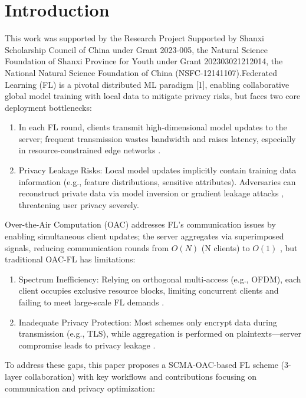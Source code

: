 \documentclass[runningheads]{llncs}
\begin{document}
\section{Introduction}
This work was supported by the Research Project Supported by Shanxi Scholarship Council of China under Grant 2023-005, the Natural Science Foundation of Shanxi Province for Youth under Grant 202303021212014, the National Natural Science Foundation of China (NSFC-12141107).Federated Learning (FL) is a pivotal distributed ML paradigm [1], enabling collaborative global model training with local data to mitigate privacy risks, but faces two core deployment bottlenecks:
\begin{enumerate}
\item In each FL round, clients transmit high-dimensional model updates to the server; frequent transmission wastes bandwidth and raises latency, especially in resource-constrained edge networks \cite{wang2019adaptive}.
\item  Privacy Leakage Risks: Local model updates implicitly contain training data information (e.g., feature distributions, sensitive attributes). Adversaries can reconstruct private data via model inversion or gradient leakage attacks \cite{yin2021comprehensive}, threatening user privacy severely.
\end{enumerate}
Over-the-Air Computation (OAC) addresses FL's communication issues by enabling simultaneous client updates; the server aggregates via superimposed signals, reducing communication rounds from \(O(N)\) (N clients) to \(O(1)\) \cite{yang2020federated}, but traditional OAC-FL has limitations:
\begin{enumerate}
\item Spectrum Inefficiency: Relying on orthogonal multi-access (e.g., OFDM), each client occupies exclusive resource blocks, limiting concurrent clients and failing to meet large-scale FL demands \cite{you2023broadband}.
\item Inadequate Privacy Protection: Most schemes only encrypt data during transmission (e.g., TLS), while aggregation is performed on plaintexts—server compromise leads to privacy leakage \cite{10251646}.
\end{enumerate}
To address these gaps, this paper proposes a SCMA-OAC-based FL scheme (3-layer collaboration) with key workflows and contributions focusing on communication and privacy optimization:
\end{document}
